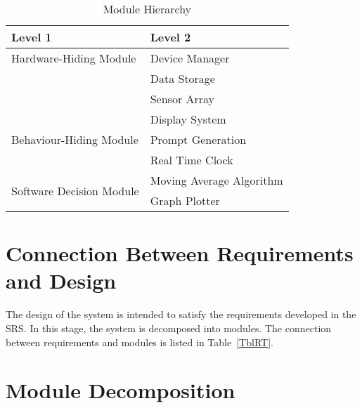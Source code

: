 \documentclass[12pt, titlepage]{article}
\begin{document}
\begin{table}[h!]
  \centering
  \begin{tabular}{p{} p{}}
    \toprule
    \textbf{Level 1}                                      & \textbf{Level 2}         \\
    \midrule

    {Hardware-Hiding Module}                              & Device Manager           \\
                                                          & Data Storage             \\
                                                          & Sensor Array             \\

    \midrule

    \multirow{3}{0.3\textwidth}{Behaviour-Hiding Module}  & Display System           \\
                                                          & Prompt Generation        \\
                                                          & Real Time Clock          \\


    \midrule

    \multirow{3}{0.3\textwidth}{Software Decision Module} & Moving Average Algorithm \\
                                                          & Graph Plotter            \\

    \bottomrule
  \end{tabular}
  \caption{Module Hierarchy}
  \label{TblMH}
\end{table}

\section{Connection Between Requirements and Design} \label{SecConnection}

The design of the system is intended to satisfy the requirements developed in
the SRS. In this stage, the system is decomposed into modules. The connection
between requirements and modules is listed in Table~\ref{TblRT}.

\section{Module Decomposition} \label{SecMD}
\end{document}
